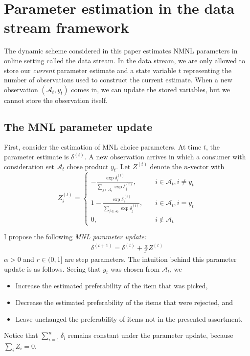 \documentclass[preprint,12pt,authoryear]{elsarticle}
\begin{document}
\section{Parameter estimation in the data stream framework}
The dynamic scheme considered in this paper estimates NMNL parameters in online setting called the data stream. In the data stream, we are only allowed to store our \emph{current} parameter estimate and a state variable $t$ representing the number of observations used to construct the current estimate. When a new observation $(\mathcal{A}_t, y_t)$ comes in, we can update the stored variables, but we cannot store the observation itself. %

\subsection{The MNL parameter update}
First, consider the estimation of MNL choice parameters. At time $t$, the parameter estimate is $\delta^{(t)}$. A new observation arrives in which a consumer with consideration set $\mathcal{A}_t$ chose product $y_t$. Let $Z^{(t)}$ denote the $n$-vector with
\begin{equation}Z^{(t)}_i =
\begin{cases}
 - \frac{\exp \delta^{(t)}_i}{\sum_{j\in \mathcal{A}_t} \exp \delta^{(t)}_j}, \quad& i \in \mathcal{A}_t, i\neq y_t \\
1 - \frac{\exp \delta^{(t)}_i}{\sum_{j\in \mathcal{A}_t} \exp \delta^{(t)}_j} , \quad& i \in \mathcal{A}_t, i =  y_t \\
0, \quad & i \notin \mathcal{A}_t
\end{cases}
\end{equation}

I propose the following \emph{MNL parameter update:}
\begin{align} \label{mnlparameterupdate}
\delta^{(t+1)} = \delta^{(t)} + \frac{\alpha}{t^r} Z^{(t)}
\end{align}
$\alpha >0$ and $r \in (0, 1]$ are step parameters. The intuition behind this parameter update is as follows. Seeing that $y_t$ was chosen from $\mathcal{A}_t$, we 
\begin{itemize}
\item Increase the estimated preferability of the item that was picked,
\item Decrease the estimated preferability of the items that were rejected, and
\item Leave unchanged the preferability of items not in the presented assortment.
\end{itemize}
Notice that $\sum_{i=1}^n \delta_i$ remains constant under the parameter update, because $\sum_i Z_i = 0$. 
\end{document}
